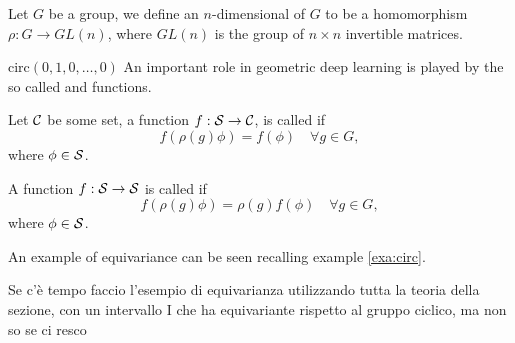 \documentclass[../3.tex]{subfiles}
\begin{document}
    \begin{defn}
        Let $G$ be a group, we define an $n$-dimensional  of $G$ to be a homomorphism $\rho : G \to GL(n)$,
        where $GL(n)$ is the group of $n \times n$ invertible matrices.
    \end{defn}
    $\text{circ}(0,1,0,\dots,0)$
    An important role in geometric deep learning is played by the so called  and  functions.

    \begin{defn}
        Let $\mathcal{C}$ be some set, a function $f : \mathcal{S} \to \mathcal{C}$, is called  if
        \[ f(\rho(g)\phi) = f(\phi) \quad \forall g \in G, \]
        where $\phi \in \mathcal{S}$.
   \end{defn}

   \begin{defn}
       A function $f : \mathcal{S} \to \mathcal{S}$ is called  if 
       \[ f(\rho(g)\phi) = \rho(g)f(\phi) \quad \forall g \in G, \]
       where $\phi \in \mathcal{S}$.
   \end{defn}

   An example of equivariance can be seen recalling example \ref{exa:circ}.

   {\color{red}
   \begin{exa}
        Se c'è tempo faccio l'esempio di equivarianza utilizzando tutta la teoria della sezione, con un intervallo I che ha 
        equivariante rispetto al gruppo ciclico, ma non so se ci resco
   \end{exa}
   }
\end{document}
